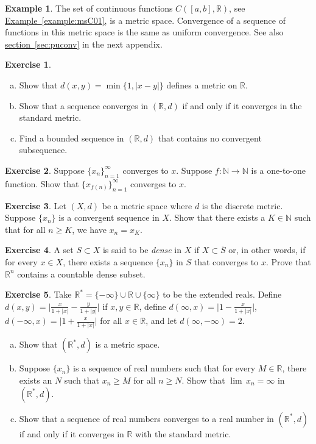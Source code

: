 \documentclass[12pt,openany]{book}
\newcommand{\widebar}[1]{\overline{#1}}
\newcommand{\sabs}[1]{\lvert {#1} \rvert}
\newcommand{\babs}[1]{\bigl\lvert {#1} \bigr\rvert}
\newcommand{\R}{{\mathbb{R}}}
\newcommand{\N}{{\mathbb{N}}}
\theoremstyle{plain}
\theoremstyle{remark}
\theoremstyle{definition}
\newenvironment{exbox}{%
    \def\FrameCommand{\vrule width 1pt \relax\hspace{10pt}}%
    \MakeFramed{\advance\hsize-\width\FrameRestore}%
}{%
    \endMakeFramed
}
\newenvironment{exparts}{%
    \leavevmode\begin{enumerate}[a),noitemsep,topsep=0pt,parsep=0pt,partopsep=0pt]
}{%
    \end{enumerate}
}
\theoremstyle{exercise}
\newtheorem{exercise}{Exercise}[section]
\theoremstyle{example}
\newtheorem{example}[thm]{Example}
\newcommand{\sectionref}[1]{\hyperref[#1]{section~\ref*{#1}}}
\newcommand{\exampleref}[1]{\hyperref[#1]{Example~\ref*{#1}}}
\begin{document}
\begin{example}
The set of continuous functions $C([a,b],\R)$, see \exampleref{example:msC01},
is a metric space.  Convergence of a sequence of functions
in this metric space is the same as uniform convergence.  See also
\sectionref{sec:puconv} in the next appendix.
\end{example}

\begin{exbox}
\begin{exercise}
\begin{exparts}
\item
Show that $d(x,y) = \min \bigl\{ 1, \sabs{x-y} \bigr\}$ defines a metric on $\R$.
\item
Show that a sequence converges in $(\R,d)$ if and only if it converges
in the standard metric.
\item
Find a bounded sequence in $(\R,d)$ that
contains no convergent subsequence.
\end{exparts}
\end{exercise}

\begin{exercise}
Suppose $\{x_n\}_{n=1}^\infty$ converges to $x$.  Suppose $f \colon \N
\to \N$ is a one-to-one function.  Show that
$\{ x_{f(n)} \}_{n=1}^\infty$ converges to $x$.
\end{exercise}

\begin{exercise}
Let $(X,d)$ be a metric space where $d$ is the discrete metric.  Suppose 
$\{ x_n \}$ is a convergent sequence in $X$.  Show that there exists
a $K \in \N$ such that for all $n \geq K$, we have $x_n = x_K$.
\end{exercise}

\begin{exercise}
A set $S \subset X$ is said to be \emph{dense} in $X$ if
$X \subset \widebar{S}$ or, in other words, if for every $x \in X$,
there exists a sequence $\{ x_n \}$ in $S$ that converges to $x$.  Prove
that $\R^n$ contains a countable dense subset.
\end{exercise}

\begin{exercise} \label{exercise:extendedrealsmetric}
Take $\R^* = \{ -\infty \} \cup \R \cup \{ \infty \}$ to be the extended reals.
Define $d(x,y) = \babs{\frac{x}{1+\sabs{x}} - \frac{y}{1+\sabs{y}}}$
if $x, y \in \R$,
define $d(\infty,x) = \babs{1 - \frac{x}{1+\sabs{x}}}$,
$d(-\infty,x) = \babs{1 + \frac{x}{1+\sabs{x}}}$
for all $x \in \R$, and
let $d(\infty,-\infty) = 2$.
\begin{exparts}
\item
Show that $(\R^*,d)$ is a metric space.
\item
Suppose $\{ x_n \}$ is a sequence of real numbers such that
for every $M \in \R$, there exists an $N$ such that
$x_n \geq M$ for all $n \geq N$.  Show that $\lim\, x_n = \infty$ in
$(\R^*,d)$.
\item
Show that a sequence of real numbers converges to a real number
in $(\R^*,d)$ if and
only if it converges in $\R$ with the standard metric.
\end{exparts}
\end{exercise}


\end{exbox}
\end{document}
